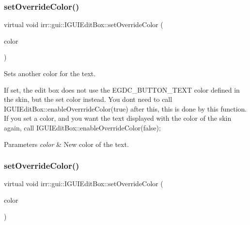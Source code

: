 \subsubsection{\texorpdfstring{set\+Override\+Color()}{setOverrideColor()}\hspace{0.1cm}{\footnotesize\ttfamily [1/2]}}
{\footnotesize\ttfamily virtual void irr\+::gui\+::\+I\+G\+U\+I\+Edit\+Box\+::set\+Override\+Color (\begin{DoxyParamCaption}\item[{\hyperlink{classirr_1_1video_1_1SColor}{video\+::\+S\+Color}}]{color }\end{DoxyParamCaption})\hspace{0.3cm}{\ttfamily [pure virtual]}}



Sets another color for the text. 

If set, the edit box does not use the E\+G\+D\+C\+\_\+\+B\+U\+T\+T\+O\+N\+\_\+\+T\+E\+XT color defined in the skin, but the set color instead. You don\textquotesingle{}t need to call I\+G\+U\+I\+Edit\+Box\+::enable\+Overrride\+Color(true) after this, this is done by this function. If you set a color, and you want the text displayed with the color of the skin again, call I\+G\+U\+I\+Edit\+Box\+::enable\+Override\+Color(false); 
\begin{DoxyParams}{Parameters}
{\em color} & New color of the text. \\
\hline
\end{DoxyParams}
\mbox{\label{classirr_1_1gui_1_1IGUIEditBox_aa134d2a36c52abcb4881da0267031c47}} 
\subsubsection{\texorpdfstring{set\+Override\+Color()}{setOverrideColor()}\hspace{0.1cm}{\footnotesize\ttfamily [2/2]}}
{\footnotesize\ttfamily virtual void irr\+::gui\+::\+I\+G\+U\+I\+Edit\+Box\+::set\+Override\+Color (\begin{DoxyParamCaption}\item[{\hyperlink{classirr_1_1video_1_1SColor}{video\+::\+S\+Color}}]{color }\end{DoxyParamCaption})\hspace{0.3cm}{\ttfamily [pure virtual]}}



